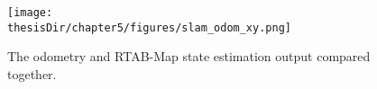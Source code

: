 \begin{figure}
  \centering
  \captionsetup{justification=centering}
  \texttt{[image: \\thesisDir/chapter5/figures/slam\_odom\_xy.png]}
  \caption{The odometry and RTAB-Map state estimation output compared together.}
  \label{fig:slam_odom_xy}
\end{figure}

